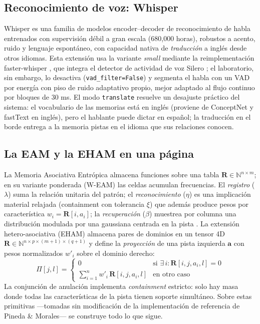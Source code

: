 \subsection{Reconocimiento de voz: Whisper}

Whisper \cite{radford2023whisper} es una familia de modelos encoder--decoder de
reconocimiento de habla entrenados con supervisión débil a gran escala (680{,}000
horas), robustos a acento, ruido y lenguaje espontáneo, con capacidad nativa de
\emph{traducción} a inglés desde otros idiomas.
Esta extensión usa la variante \emph{small} mediante la reimplementación
faster-whisper \cite{systran2023fasterwhisper}, que integra el detector de actividad
de voz Silero \cite{silero2021vad}; el laboratorio, sin embargo, lo desactiva
(\texttt{vad\_filter=False}) y segmenta el habla con un VAD por energía con piso de
ruido adaptativo propio, mejor adaptado al flujo continuo por bloques de 30 ms.
El modo \texttt{translate} resuelve un desajuste práctico del sistema: el vocabulario
de las memorias está en inglés (proviene de ConceptNet \cite{speer2017conceptnet} y
fastText en inglés), pero el hablante puede dictar en español; la traducción en el
borde entrega a la memoria pistas en el idioma que sus relaciones conocen.

\subsection{La EAM y la EHAM en una página}

La Memoria Asociativa Entrópica \cite{pineda2021entropic} almacena funciones sobre una
tabla $\mathbf{R} \in \mathbb{N}^{n \times m}$; en su variante ponderada (W-EAM)
\cite{pineda2022weighted} las celdas acumulan frecuencias.
El \emph{registro} ($\lambda$) suma la relación unitaria del patrón; el
\emph{reconocimiento} ($\eta$) es una implicación material relajada (containment con
tolerancia $\xi$) que además produce pesos por característica
$w_i = \mathbf{R}[i, a_i]$; la \emph{recuperación} ($\beta$) muestrea por columna una
distribución modulada por una gaussiana centrada en la pista
\cite{pineda2023imagery}.
La extensión hetero-asociativa (EHAM)
\cite{morales2024hetero,morales2025missing} almacena pares de dominios en un tensor 4D
$\mathbf{R} \in \mathbb{N}^{n \times p \times (m+1) \times (q+1)}$ y define la
\emph{proyección} de una pista izquierda $\mathbf{a}$ con pesos normalizados $w'_i$
sobre el dominio derecho:
\begin{equation}
    \Pi[j, l] = \begin{cases}
        0 & \text{si } \exists\, i : \mathbf{R}[i, j, a_i, l] = 0 \\[4pt]
        \displaystyle\sum_{i=1}^{n} w'_i\, \mathbf{R}[i, j, a_i, l] & \text{en otro caso}
    \end{cases}
    \label{eq:proyeccion}
\end{equation}
La conjunción de anulación implementa \emph{containment} estricto: solo hay masa donde
todas las características de la pista tienen soporte simultáneo.
Sobre estas primitivas ---tomadas sin modificación de la implementación de referencia
de Pineda \& Morales--- se construye todo lo que sigue.

